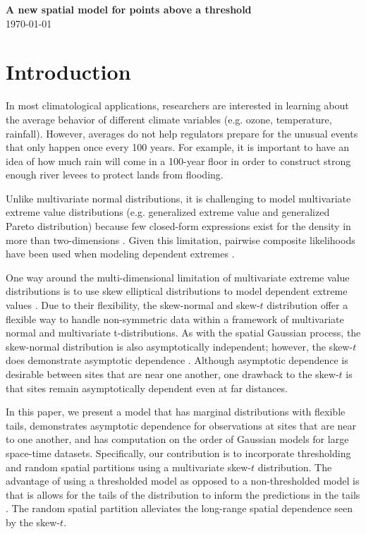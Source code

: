 \documentclass[11pt]{article}
\begin{document}
\linenumbers

\begin{center}
{\Large {\bf A new spatial model for points above a threshold}}\\
\today
\end{center}

\section{Introduction}\label{s:intro}
In most climatological applications, researchers are interested in learning about the average behavior of different climate variables (e.g. ozone, temperature, rainfall).
However, averages do not help regulators prepare for the unusual events that only happen once every 100 years.
For example, it is important to have an idea of how much rain will come in a 100-year floor in order to construct strong enough river levees to protect lands from flooding.

Unlike multivariate normal distributions, it is challenging to model multivariate extreme value distributions (e.g. generalized extreme value and generalized Pareto distribution) because few closed-form expressions exist for the density in more than two-dimensions \citep{Coles1991}.
Given this limitation, pairwise composite likelihoods have been used when modeling dependent extremes \citep{Padoan2010,Blanchet2011,Huser2013}.

One way around the multi-dimensional limitation of multivariate extreme value distributions is to use skew elliptical distributions to model dependent extreme values \citep{Genton2004,Zhang2010,Padoan2011}.
Due to their flexibility, the skew-normal and skew-$t$ distribution offer a flexible way to handle non-symmetric data within a framework of multivariate normal and multivariate t-distributions.
As with the spatial Gaussian process, the skew-normal distribution is also asymptotically independent; however, the skew-$t$ does demonstrate asymptotic dependence \citep{Padoan2011}.
Although asymptotic dependence is desirable between sites that are near one another, one drawback to the skew-$t$ is that sites remain asymptotically dependent even at far distances.

In this paper, we present a model that has marginal distributions with flexible tails, demonstrates asymptotic dependence for observations at sites that are near to one another, and has computation on the order of Gaussian models for large space-time datasets.
Specifically, our contribution is to incorporate thresholding and random spatial partitions using a multivariate skew-$t$ distribution.
The advantage of using a thresholded model as opposed to a non-thresholded model is that is allows for the tails of the distribution to inform the predictions in the tails \citep{DuMouchel1983}.
The random spatial partition alleviates the long-range spatial dependence seen by the skew-$t$.
\end{document}
